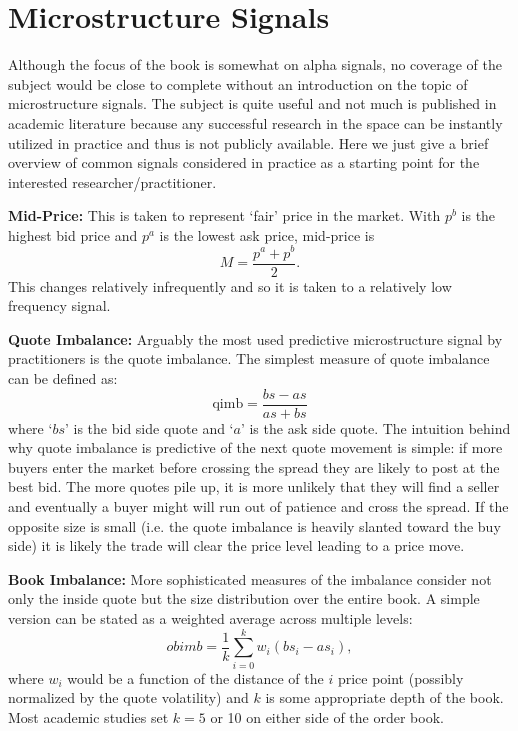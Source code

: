 \section{Microstructure Signals }

Although the focus of the book is somewhat on alpha signals, no coverage of the subject would be close to complete without an introduction on the topic of microstructure signals. The subject is quite useful and not much is published in academic literature because any successful research in the space can be instantly utilized in practice and thus is not publicly available. Here we just give a brief overview of common signals considered in practice as a starting point for the interested researcher/practitioner. \twomedskip


\noindent\textbf{Mid-Price:} This is taken to represent `fair' price in the market. With $p^b$ is the highest bid price and $p^a$ is the lowest ask price, mid-price is
	\begin{equation} \label{eqn:mpapbover2}
	M= \dfrac{p^a + p^b}{2}.
	\end{equation}
This changes relatively infrequently and so it is taken to a relatively low frequency signal. \twomedskip


\noindent\textbf{Quote Imbalance:} Arguably the most used predictive microstructure signal by practitioners is the quote imbalance.  The simplest measure of quote imbalance can be defined as: 
	\begin{equation}\label{eq:q_imb}
		\text{qimb} = \frac{bs - as}{as + bs}
	\end{equation}
where `$bs$' is the bid side quote and `$a$' is the ask side quote. The intuition behind why quote imbalance is predictive of the next quote movement is simple: if more buyers enter the market before crossing the spread they are likely to post at the best bid. The more quotes pile up, it is more unlikely that they will find a seller and eventually a buyer might will run out of patience and cross the spread. If the opposite size is small (i.e. the quote imbalance is heavily slanted toward the buy side) it is likely the trade will clear the price level leading to a price move. \twomedskip


\noindent\textbf{Book Imbalance:} More sophisticated measures of the imbalance consider not only the inside quote but the size distribution over the entire book. A simple version can be stated as a weighted average across multiple levels:
	\begin{equation}\label{eq:microprc}
		obimb = \frac{1}{k}\sum_{i=0}^k w_i (bs_i-  as_i),
	\end{equation}
where $w_i$ would be a function of the distance of the $i$ price point (possibly normalized by the quote volatility) and $k$ is some appropriate depth of the book. Most academic studies set $k=5$ or 10 on either side of the order book. \twomedskip


